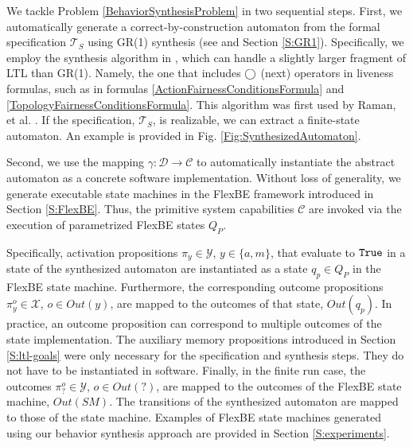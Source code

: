 

We tackle Problem \ref{BehaviorSynthesisProblem} in two sequential steps.
First, we automatically generate a correct-by-construction automaton from the formal specification $\mathcal{T}_S$ using GR(1) synthesis (see \cite{Bloem2012GR1} and Section \ref{S:GR1}).
Specifically, we employ the synthesis algorithm in \cite{SLUGS}, which can handle a slightly larger fragment of LTL than GR(1).
Namely, the one that includes $\operatorname{\bigcirc}$ (next) operators in liveness formulas, such as in formulas \eqref{ActionFairnessConditionsFormula} and \eqref{TopologyFairnessConditionsFormula}.
This algorithm was first used by Raman, et al. \cite{Vasu2013ICRA}.
If the specification, $\mathcal{T}_S$, is realizable, we can extract a finite-state automaton.
An example is provided in Fig. \ref{Fig:SynthesizedAutomaton}.

Second, we use the mapping $\gamma: \mathcal{D} \rightarrow \mathcal{C}$ to automatically instantiate the abstract automaton as a concrete software implementation.
Without loss of generality, we generate executable state machines in the FlexBE framework introduced in Section \ref{S:FlexBE}.
Thus, the primitive system capabilities $\mathcal{C}$ are invoked via the execution of parametrized FlexBE states $Q_P$.

Specifically, activation propositions $\pi_y \in \mathcal{Y}$, $y \in \{ a, m \}$, that evaluate to $\mathtt{True}$ in a state of the synthesized automaton are instantiated as a state $q_p \in Q_P$ in the FlexBE state machine.
Furthermore, the corresponding outcome propositions $\pi_y^o \in \mathcal{X}$, $o \in Out(y)$, are mapped to the outcomes of that state, $Out(q_p)$.
In practice, an outcome proposition can correspond to multiple outcomes of the state implementation.
The auxiliary memory propositions introduced in Section \ref{S:ltl-goals} were only necessary for the specification and synthesis steps.
They do not have to be instantiated in software.
Finally, in the finite run case, the outcomes $\pi_?^o \in \mathcal{Y}$, $o \in Out(?)$, are mapped to the outcomes of the FlexBE state machine, $Out(SM)$.
The transitions of the synthesized automaton are mapped to those of the state machine.
Examples of FlexBE state machines generated using our behavior synthesis approach are provided in Section \ref{S:experiments}.

